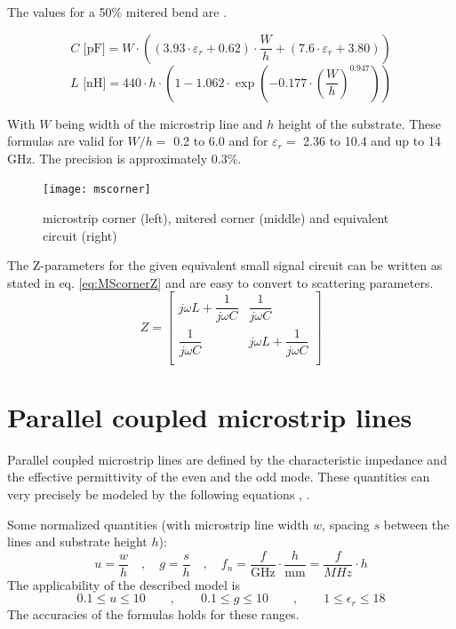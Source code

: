 \documentclass[10pt]{report}
\begin{document}
The values for a 50\% mitered bend are \cite{Kirschning4}.

\begin{equation}
C \text{ [pF]} = W \cdot \left( (3.93\cdot\varepsilon_r + 0.62) \cdot \frac{W}{h} +
			       (7.6\cdot\varepsilon_r + 3.80) \right)
\end{equation}
\begin{equation}
L \text{ [nH]} = 440\cdot h \cdot \left( 1 - 1.062\cdot\exp\left( -0.177\cdot
		   \left( \frac{W}{h} \right)^{0.947} \right) \right)
\end{equation}

With $W$ being width of the microstrip line and $h$ height of the
substrate.  These formulas are valid for $W/h = $ 0.2 to 6.0 and for
$\varepsilon_r = $ 2.36 to 10.4 and up to 14 GHz. The precision is
approximately 0.3\%.

\begin{figure}[ht]
\begin{center}
\texttt{[image: mscorner]}
\end{center}
\caption{microstrip corner (left), mitered corner (middle) and equivalent circuit (right)}
\label{fig:MScorner}
\end{figure}
\FloatBarrier

The Z-parameters for the given equivalent small signal circuit can be
written as stated in eq. \eqref{eq:MScornerZ} and are easy to convert
to scattering parameters.
\begin{equation}
Z =
\begin{bmatrix}
j\omega L + \dfrac{1}{j\omega C} & \dfrac{1}{j\omega C}\\
\dfrac{1}{j\omega C} & j\omega L + \dfrac{1}{j\omega C}\\
\end{bmatrix}
\label{eq:MScornerZ}
\end{equation}

\section{Parallel coupled microstrip lines}

Parallel coupled microstrip lines are defined by the characteristic
impedance and the effective permittivity of the even and the odd mode.
These quantities can very precisely be modeled by the following
equations \cite{Kirschning5}, \cite{Kirschning6}.

\addvspace{12pt}

Some normalized quantities (with microstrip line width $w$, spacing $s$ between
the lines and substrate height $h$):
\begin{equation}
u = \frac{w}{h} \quad,\quad g = \frac{s}{h} \quad,\quad
f_n = \frac{f}{\text{GHz}}\cdot\frac{h}{\text{mm}} = \frac{f}{MHz}\cdot h
\end{equation}
The applicability of the described model is
\begin{equation}
0.1\le u\le 10 \qquad,\qquad 0.1\le g\le 10 \qquad,\qquad 1\le \epsilon_r\le 18
\end{equation}
The accuracies of the formulas holds for these ranges.
\end{document}
